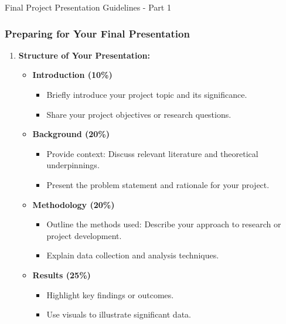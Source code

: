 \documentclass[aspectratio=169]{beamer}
\begin{document}
\begin{frame}[fragile]{Final Project Presentation Guidelines - Part 1}
    \frametitle{Preparing for Your Final Presentation}
    \begin{enumerate}
        \item \textbf{Structure of Your Presentation:}
        \begin{itemize}
            \item \textbf{Introduction (10\%)} 
            \begin{itemize}
                \item Briefly introduce your project topic and its significance.
                \item Share your project objectives or research questions.
            \end{itemize}

            \item \textbf{Background (20\%)} 
            \begin{itemize}
                \item Provide context: Discuss relevant literature and theoretical underpinnings.
                \item Present the problem statement and rationale for your project.
            \end{itemize}

            \item \textbf{Methodology (20\%)} 
            \begin{itemize}
                \item Outline the methods used: Describe your approach to research or project development.
                \item Explain data collection and analysis techniques.
            \end{itemize}

            \item \textbf{Results (25\%)} 
            \begin{itemize}
                \item Highlight key findings or outcomes.
                \item Use visuals to illustrate significant data.
            \end{itemize}
        \end{itemize}
    \end{enumerate}
\end{frame}
\end{document}

